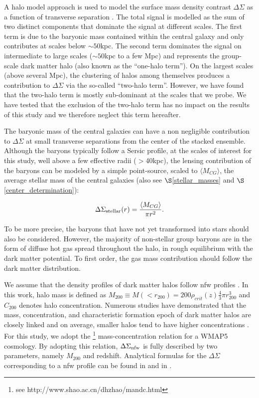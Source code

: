 \documentclass[12pt]{emulateapj}
\newcommand{\eg}{{\it e.g.}}
\begin{document}
A halo model approach is used to model the surface mass density
contrast $\Delta\Sigma$ as a function of transverse separation
\citep[\eg][]{Mandelbaum:2005a,Mandelbaum:2006,Mandelbaum:2006c,Yoo:2006,Johnston:2007}. The
total signal is modelled as the sum of two distinct components that
dominate the signal at different scales. The first term is due to the
baryonic mass contained within the central galaxy and only contributes
at scales below $\sim 50$kpc. The second term dominates the signal on
intermediate to large scales ($\sim 50$kpc to a few Mpc) and
represents the group-scale dark matter halo (also known as the
``one-halo term''). On the largest scales (above several Mpc), the
clustering of halos among themselves produces a contribution to
$\Delta\Sigma$ via the so-called ``two-halo term''. However, we have
found that the two-halo term is mostly sub-dominant at the scales that
we probe. We have tested that the exclusion of the two-halo term has
no impact on the results of this study and we therefore neglect this
term hereafter.

The baryonic mass of the central galaxies can have a non negligible
contribution to $\Delta\Sigma$ at small transverse separations from
the center of the stacked ensemble. Although the baryons typically
follow a Sersic profile, at the scales of interest for this study,
well above a few effective radii ($>$40kpc), the lensing
contribution of the baryons can be modeled by a simple point-source,
scaled to $\langle M_{CG}\rangle$, the average stellar mass of the
central galaxies (also see $\S$\ref{stellar_masses} and
$\S$\ref{center_determination}):

\begin{equation}
  \Delta\Sigma_{\rm stellar}(r)=\frac{\langle M_{CG}\rangle }{\pi r^2}.
\end{equation}

To be more precise, the baryons that have not yet transformed into
stars should also be considered. However, the majority of non-stellar
group baryons are in the form of diffuse hot gas spread throughout the
halo, in rough equilibrium with the dark matter potential. To first
order, the gas mass contribution should follow the dark matter
distribution.

We assume that the density profiles of dark matter halos follow {\sc
  nfw} profiles \citep[][]{Navarro:1997}. In this work, halo mass is
defined as $M_{200}\equiv M(<r_{200})=200\rho_{crit}(z) \frac{4}{3}\pi
r_{200}^3$ and $C_{200}$ denotes halo concentration. Numerous studies
have demonstrated that the mass, concentration, and characteristic
formation epoch of dark matter halos are closely linked and on
average, smaller halos tend to have higher concentrations
\citep[][]{Bullock:2001,Wechsler:2002,Maccio:2007,Zhao:2008}. For this
study, we adopt the \citet{Zhao:2008}\footnote[3]{see
  http://www.shao.ac.cn/dhzhao/mandc.html} mass-concentration relation
for a WMAP5 cosmology. By adopting this relation, $\Delta\Sigma_{\rm
  nfw}$ is fully described by two parameters, namely $M_{200}$ and
redshift.  Analytical formulas for the $\Delta\Sigma$ corresponding to
a {\sc nfw} profile can be found in \citet{Wright:2000} and in
\citet[][]{Bartelmann:1996}.
\end{document}
